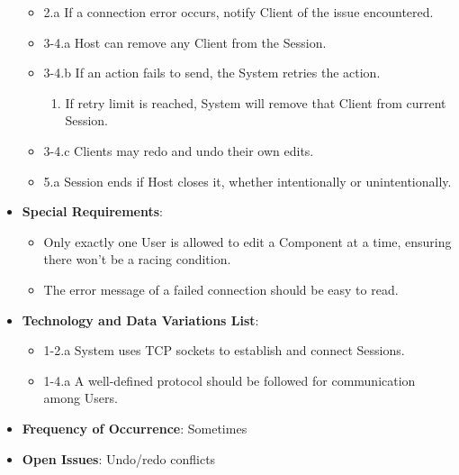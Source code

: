 \documentclass[12pt]{article}
\begin{document}
\begin{itemize}
\begin{itemize}
            \item 2.a If a connection error occurs, notify Client of the issue encountered.
            \item 3-4.a Host can remove any Client from the Session.
            \item 3-4.b If an action fails to send, the System retries the action.
            \begin{enumerate}
                \item If retry limit is reached, System will remove that Client from current Session.
            \end{enumerate}
            \item 3-4.c Clients may redo and undo their own edits.
            \item 5.a Session ends if Host closes it, whether intentionally or unintentionally.
        \end{itemize}
        \item \textbf{Special Requirements}:
        \begin{itemize}
            \item Only exactly one User is allowed to edit a Component at a time, ensuring there won't be a racing condition.
            \item The error message of a failed connection should be easy to read.
        \end{itemize}
        \item \textbf{Technology and Data Variations List}:
        \begin{itemize}
            \item 1-2.a System uses TCP sockets to establish and connect Sessions.
            \item 1-4.a A well-defined protocol should be followed for communication among Users.
        \end{itemize}
        \item \textbf{Frequency of Occurrence}: Sometimes
        \item \textbf{Open Issues}: Undo/redo conflicts
    \end{itemize}
\end{document}
